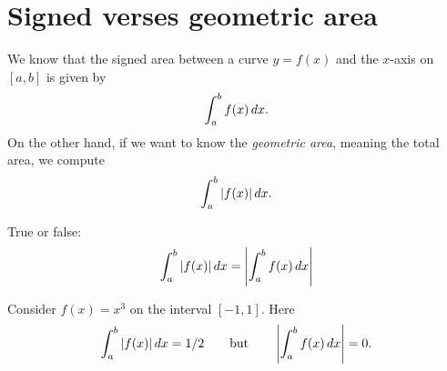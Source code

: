 \documentclass{ximera}
\begin{document}
\section{Signed verses geometric area}


We know that the signed area between a curve $y=f(x)$ and the $x$-axis
on $[a,b]$ is given by
\[
\int_a^b f(x) \mathop{}\!d x.
\]
On the other hand, if we want to know the \textit{geometric area},
meaning the total area, we compute
\[
\int_a^b |f(x)| \mathop{}\!d x.
\]
\begin{question}
  True or false:
  \[
  \int_a^b |f(x)| \mathop{}\!d x = \left|\int_a^b f(x) \mathop{}\!d x\right|
  \]
  \begin{multipleChoice}
  \end{multipleChoice}
  \begin{feedback}
    Consider $f(x) = x^3$ on the interval $[-1,1]$. Here
    \[
    \int_a^b |f(x)| \mathop{}\!d x = 1/2 \qquad\text{but}\qquad \left|\int_a^b
    f(x) \mathop{}\!d x\right| = 0.
    \]
  \end{feedback}
\end{question}
\end{document}
